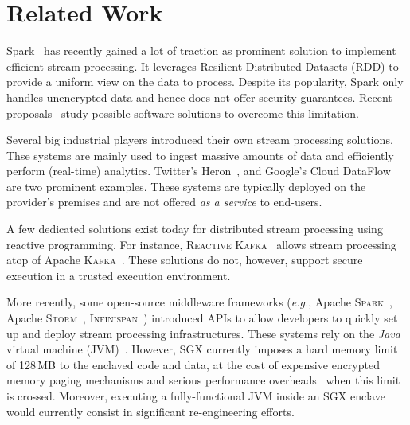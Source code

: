 \section{Related Work}\label{sec:rw}


Spark~\cite{Zaharia:2013:DSF:2517349.2522737} has recently gained a lot of traction as prominent solution to implement efficient stream processing.
It leverages Resilient Distributed Datasets (RDD) to provide a uniform view on the data to process.
Despite its popularity, Spark only handles unencrypted data and hence does not offer security guarantees.
Recent proposals~\cite{7840754} study possible software solutions to overcome this limitation.

Several big industrial players introduced their own stream processing solutions.
Thse systems are mainly used to ingest massive amounts of data and efficiently perform (real-time) analytics.
Twitter's Heron~\cite{Kulkarni:2015:THS:2723372.2742788}, and Google's Cloud DataFlow~\cite{Akidau:2015:DMP:2824032.2824076} are two prominent examples.
These systems are typically deployed on the provider's premises and are not offered \emph{as a service} to end-users.

A few dedicated solutions exist today for distributed stream processing using reactive programming.
For instance, \textsc{Reactive Kafka}~\cite{reactivekafka} allows stream processing atop of Apache \textsc{Kafka}~\cite{apachekafka,kreps2011kafka}.
These solutions do not, however, support secure execution in a trusted execution environment.

More recently, some open-source middleware frameworks (\emph{e.g.}, Apache \textsc{Spark}~\cite{apachesparkstreaming}, Apache \textsc{Storm}~\cite{apachestorm}, \textsc{Infinispan}~\cite{infinispan}) introduced APIs to allow developers to quickly set up and deploy stream processing infrastructures.
These systems rely on the \emph{Java} virtual machine (JVM)~\cite{lindholm2014java}.
However, SGX currently imposes a hard memory limit of 128\,MB to the enclaved code and data, at the cost of expensive encrypted memory paging mechanisms and serious performance overheads~\cite{pires_scbr:2016,brenner_securekeeper:_2016} when this limit is crossed.
Moreover, executing a fully-functional JVM inside an SGX enclave would currently consist in significant re-engineering efforts.

